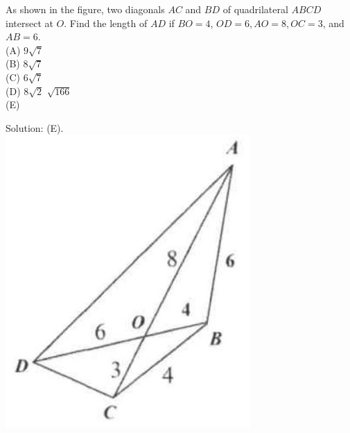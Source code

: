 \documentclass{article}
\begin{document}
As shown in the figure, two diagonals \(A C\) and \(B D\) of quadrilateral \(A B C D\) intersect at \(O\). Find the length of \(A D\) if \(B O=4\), \(O D=6, A O=8, O C=3\), and \(A B=6\).\\
(A) \(9 \sqrt{7}\)\\
(B) \(8 \sqrt{7}\)\\
(C) \(6 \sqrt{7}\)\\
(D) \(8 \sqrt{2}\) \(\sqrt{166}\)\\
(E)

Solution: (E).\\
\centering
\includegraphics[width=\textwidth]{images/081(2).jpg}
\end{document}
